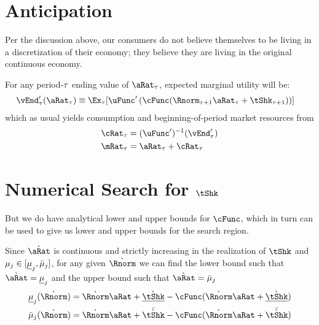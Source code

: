 \documentclass[../BufferStockTheory.tex]{subfiles}\usepackage{ApndxSteadyState}
\begin{document}
  \section{Anticipation}

  Per the discussion above, our consumers do not believe themselves to be living in a discretization of their economy; they believe they are living in the original continuous economy.

  For any period-$\tAbs$ ending value of $\point_{\tAbs}$, expected marginal utility will be:
  \begin{align}
    \vEnd^{\prime}_{\tAbs}(\point_{\tAbs}) & \equiv \Ex_{\tAbs}[\uFunc^{\prime}\left(\cFunc(\Rnorm_{\tAbs+1} \point_{\tAbs} + \tShk_{\tAbs+1})\right)]
  \end{align}
  which as usual yields consumption and beginning-of-period market resources from
  \begin{align}
    \cRat_{\tAbs} & = (\uFunc^{\prime})^{-1}(\vEnd^{\prime}_{\tAbs})
    \\ \mRat_{\tAbs} & = \point_{\tAbs}+\cRat_{\tAbs}
  \end{align}

  \pagebreak

  \onlyinsubfile{}

  \appendix

  \section{Numerical Search for $\tShk$}

  But we do have analytical lower and upper bounds for $\cFunc$, which in turn can be used to give us lower and upper bounds for the search region.
  \begin{comment}
    \begin{align}
      \Nxt{\point}-\Nxt{\Rnorm} \point + \cFunc(\Nxt{\Rnorm}\point+\Nxt{\tShk})& = \Nxt{\tShk} 
    \end{align}
  \end{comment}

  Since $\Nxt{\point}$ is continuous and strictly increasing in the realization of $\tShk$ and $\SetSub_{\that} \in [\Bot{\SetSub}_{\that},\Top{\SetSub}_{\that}]$, for any given $\Nxt{\Rnorm}$ we can find the lower bound such that ${\Nxt{\point}}=\Bot{\SetSub}_{\that}$ and the upper bound such that ${\Nxt{\point}}=\Top{\SetSub}_{\that}$
  \begin{align}
    \Bot{\SetSub}_{\that}(\Nxt{\Rnorm}) & =  \Nxt{\Rnorm} \point + \Bot{\Nxt{\tShk}} - \cFunc(\Nxt{\Rnorm}\point+\Bot{\Nxt{\tShk}})
    \\  \Top{\SetSub}_{\that}(\Nxt{\Rnorm}) & =  \Nxt{\Rnorm} \point + \Top{\Nxt{\tShk}} - \cFunc(\Nxt{\Rnorm}\point+\Top{\Nxt{\tShk}})
  \end{align}
\end{document}
